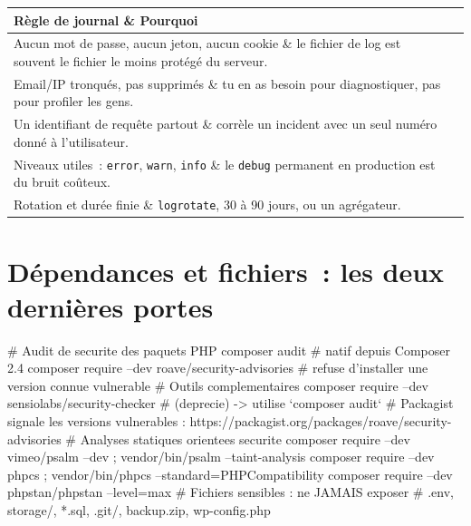 \documentclass[12pt,a4paper,twoside,openright]{book}
\makeatletter
\newenvironment{tabz}[1]{\rowcolors{2}{white}{tralight}%
  \small\setlength{\tabcolsep}{5pt}\setlength{\LTpre}{3pt}\setlength{\LTpost}{3pt}%
  \begin{longtable}{@{}#1@{}}\toprule}
  {\bottomrule\end{longtable}\normalfont\setlength{\tabcolsep}{6pt}}
\newcommand{\thd}[1]{\textbf{\color{white}#1}}
\newcommand{\headrow}{\rowcolor{theadbg}}
\makeatother
\begin{document}
\begin{tabz}{lX}
  \headrow \thd{R\`egle de journal} \& \thd{Pourquoi} \\
  \midrule
  Aucun mot de passe, aucun jeton, aucun cookie \& le fichier de log est souvent le fichier le moins prot\'eg\'e du serveur. \\
  Email/IP tronqu\'es, pas supprim\'es \& tu en as besoin pour diagnostiquer, pas pour profiler les gens. \\
  Un identifiant de requ\^ete partout \& corr\`ele un incident avec un seul num\'ero donn\'e \`a l'utilisateur. \\
  Niveaux utiles~: \verb|error|, \verb|warn|, \verb|info| \& le \verb|debug| permanent en production est du bruit co\^uteux. \\
  Rotation et dur\'ee finie \& \verb|logrotate|, 30 \`a 90 jours, ou un agr\'egateur. \\
\end{tabz}

\section{D\'ependances et fichiers~: les deux derni\`eres portes}

\begin{terminal}
# Audit de securite des paquets PHP
composer audit                                  # natif depuis Composer 2.4
composer require --dev roave/security-advisories  # refuse d'installer une version connue vulnerable
# Outils complementaires
composer require --dev sensiolabs/security-checker   # (deprecie) -> utilise `composer audit`
# Packagist signale les versions vulnerables : https://packagist.org/packages/roave/security-advisories
# Analyses statiques orientees securite
composer require --dev vimeo/psalm --dev ; vendor/bin/psalm --taint-analysis
composer require --dev phpcs ; vendor/bin/phpcs --standard=PHPCompatibility
composer require --dev phpstan/phpstan --level=max
# Fichiers sensibles : ne JAMAIS exposer
#   .env, storage/, *.sql, .git/, backup.zip, wp-config.php~
\end{terminal}

\end{document}
